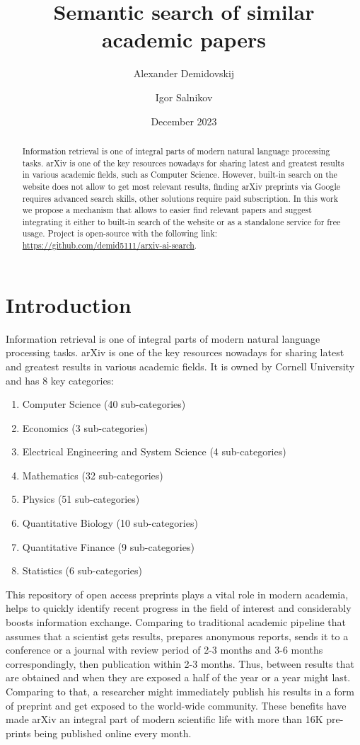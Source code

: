 \documentclass{article}
\title{Semantic search of similar academic papers}
\author{Alexander Demidovskij \and Igor Salnikov}
\date{December 2023}
\begin{document}
\maketitle

\begin{abstract}
    Information retrieval is one of integral parts of modern natural language processing tasks. arXiv is one of the key resources nowadays for sharing latest and greatest results in various academic fields, such as Computer Science. However, built-in search on the website does not allow to get most relevant results, finding arXiv preprints via Google requires advanced search skills, other solutions require paid subscription. In this work we propose a mechanism that allows to easier find relevant papers and suggest integrating it either to built-in search of the website or as a standalone service for free usage. Project is open-source with the following link: \url{https://github.com/demid5111/arxiv-ai-search}.
\end{abstract}

\section{Introduction}
    Information retrieval is one of integral parts of modern natural language processing tasks. arXiv is one of the key resources nowadays for sharing latest and greatest results in various academic fields. It is owned by Cornell University and has 8 key categories:
    
    \begin{enumerate}
        \item Computer Science (40 sub-categories)
        \item Economics (3 sub-categories)
        \item Electrical Engineering and System Science (4 sub-categories)
        \item Mathematics (32 sub-categories)
        \item Physics (51 sub-categories)
        \item Quantitative Biology (10 sub-categories)
        \item Quantitative Finance (9 sub-categories)
        \item Statistics (6 sub-categories)
    \end{enumerate}
    
    This repository of open access preprints plays a vital role in modern academia, helps to quickly identify recent progress in the field of interest and considerably boosts information exchange. Comparing to traditional academic pipeline that assumes that a scientist gets results, prepares anonymous reports, sends it to a conference or a journal with review period of 2-3 months and 3-6 months correspondingly, then publication within 2-3 months. Thus, between results that are obtained and when they are exposed a half of the year or a year might last. Comparing to that, a researcher might immediately publish his results in a form of preprint and get exposed to the world-wide community. These benefits have made arXiv an integral part of modern scientific life with more than 16K pre-prints being published online every month.
    
\end{document}
